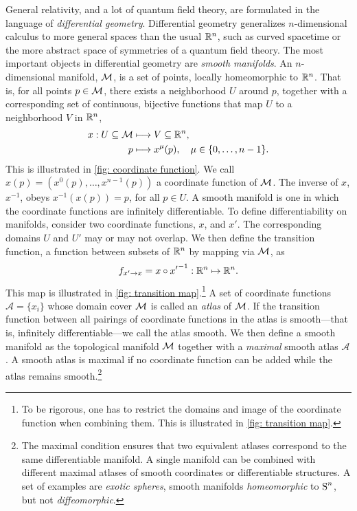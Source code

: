 General relativity, and a lot of quantum field theory, are formulated in the language of \emph{differential geometry}.
Differential geometry generalizes $n$-dimensional calculus to more general spaces than the usual $\mathbb{R}^n$, such as curved spacetime or the more abstract space of symmetries of a quantum field theory.
The most important objects in differential geometry are \emph{smooth manifolds}.
An $n$-dimensional manifold, $\mathcal{M}$, is a set of points, locally homeomorphic to $\mathbb{R}^n$.
That is, for all points $p \in \mathcal{M}$, there exists a neighborhood $U$ around $p$, together with a corresponding set of continuous, bijective functions that map $U$ to a neighborhood $V$ in $\mathbb{R}^n$,
%
\begin{align}
    x: U \subseteq \mathcal{M} & \longmapsto V \subseteq \mathbb{R}^n, \\
    p & \longmapsto x^\mu(p), \quad \mu \in \{0, \dots, n-1\}.
\end{align}
%
This is illustrated in \autoref{fig: coordinate function}.
We call $x(p) = (x^0(p), \dots, x^{n- 1}(p))$ a coordinate function of $\mathcal{M}$.
The inverse of $x$, $x^{-1}$, obeys $x^{-1}(x(p)) = p$, for all $p \in U$.
A smooth manifold is one in which the coordinate functions are infinitely differentiable.
To define differentiability on manifolds, consider two coordinate functions, $x$, and $x'$.
The corresponding domains $U$ and $U'$ may or may not overlap.
We then define the transition function, a function between subsets of $\mathbb{R}^n$ by mapping via $\mathcal{M}$, as
%
\begin{align}
    f_{x'\rightarrow x} = x \circ {x'}^{-1} : \mathbb{R}^n \mapsto \mathbb{R}^n.
\end{align}
%
This map is illustrated in \autoref{fig: transition map}.\footnote{
    To be rigorous, one has to restrict the domains and image of the coordinate function when combining them. This is illustrated in \autoref{fig: transition map}.
    }
A set of coordinate functions $\mathcal A = \{x_i\}$ whose domain cover $\mathcal{M}$ is called an \emph{atlas} of $\mathcal{M}$.
If the transition function between all pairings of coordinate functions in the atlas is smooth---that is, infinitely differentiable---we call the atlas smooth.
We then define a smooth manifold as the topological manifold $\mathcal{M}$ together with a \emph{maximal} smooth atlas $\mathcal A$.
A smooth atlas is maximal if no coordinate function can be added while the atlas remains smooth.\footnote{
    The maximal condition ensures that two equivalent atlases correspond to the same differentiable manifold. A single manifold can be combined with different maximal atlases of smooth coordinates or differentiable structures. A set of examples are \emph{exotic spheres}, smooth manifolds \emph{homeomorphic} to $\text S^n$, but not \emph{diffeomorphic}. 
    }
